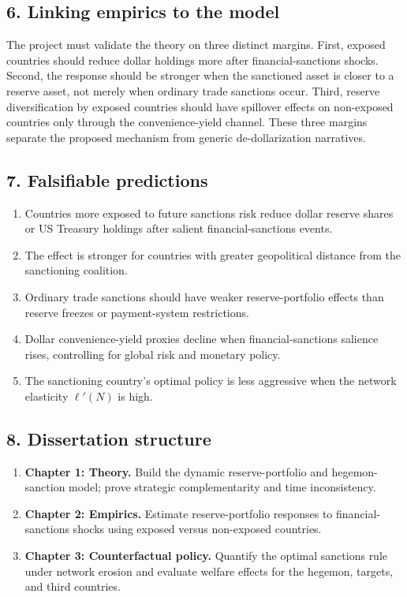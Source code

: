 \documentclass[11pt]{article}
\begin{document}
\subsection*{6. Linking empirics to the model}
The project must validate the theory on three distinct margins. First, exposed countries should reduce dollar holdings more after financial-sanctions shocks. Second, the response should be stronger when the sanctioned asset is closer to a reserve asset, not merely when ordinary trade sanctions occur. Third, reserve diversification by exposed countries should have spillover effects on non-exposed countries only through the convenience-yield channel. These three margins separate the proposed mechanism from generic de-dollarization narratives.

\subsection*{7. Falsifiable predictions}
\begin{enumerate}[label=\textbf{P\arabic*.},leftmargin=*]
\item Countries more exposed to future sanctions risk reduce dollar reserve shares or US Treasury holdings after salient financial-sanctions events.
\item The effect is stronger for countries with greater geopolitical distance from the sanctioning coalition.
\item Ordinary trade sanctions should have weaker reserve-portfolio effects than reserve freezes or payment-system restrictions.
\item Dollar convenience-yield proxies decline when financial-sanctions salience rises, controlling for global risk and monetary policy.
\item The sanctioning country's optimal policy is less aggressive when the network elasticity $\ell'(N)$ is high.
\end{enumerate}

\subsection*{8. Dissertation structure}
\begin{enumerate}[leftmargin=*]
\item \textbf{Chapter 1: Theory.} Build the dynamic reserve-portfolio and hegemon-sanction model; prove strategic complementarity and time inconsistency.
\item \textbf{Chapter 2: Empirics.} Estimate reserve-portfolio responses to financial-sanctions shocks using exposed versus non-exposed countries.
\item \textbf{Chapter 3: Counterfactual policy.} Quantify the optimal sanctions rule under network erosion and evaluate welfare effects for the hegemon, targets, and third countries.
\end{enumerate}
\end{document}
